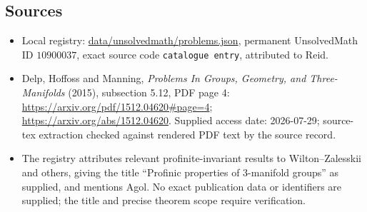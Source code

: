 \documentclass[11pt]{article}
\begin{document}
\subsection{Sources}
\begin{itemize}
\item Local registry: \url{data/unsolvedmath/problems.json}, permanent UnsolvedMath ID $10900037$, exact source code \texttt{catalogue entry}, attributed to Reid.
\item Delp, Hoffoss and Manning, \emph{Problems In Groups, Geometry, and Three-Manifolds} (2015), subsection 5.12, PDF page 4: \url{https://arxiv.org/pdf/1512.04620#page=4}; \url{https://arxiv.org/abs/1512.04620}. Supplied access date: 2026-07-29; source-tex extraction checked against rendered PDF text by the source record.
\item The registry attributes relevant profinite-invariant results to Wilton--Zalesskii and others, giving the title ``Profinic properties of 3-manifold groups'' as supplied, and mentions Agol. No exact publication data or identifiers are supplied; the title and precise theorem scope require verification.
\end{itemize}
\end{document}
